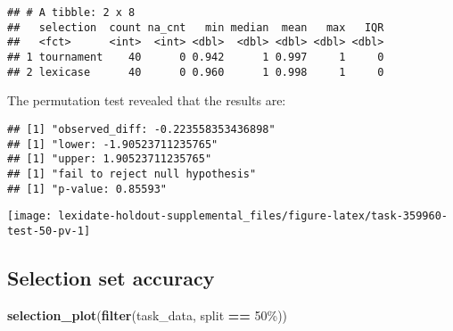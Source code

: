 \documentclass[
]{book}
\newenvironment{Shaded}{\begin{snugshade}}{\end{snugshade}}
\newcommand{\AttributeTok}[1]{\textcolor[rgb]{0.13,0.29,0.53}{#1}}
\newcommand{\DecValTok}[1]{\textcolor[rgb]{0.00,0.00,0.81}{#1}}
\newcommand{\FunctionTok}[1]{\textcolor[rgb]{0.13,0.29,0.53}{\textbf{#1}}}
\newcommand{\NormalTok}[1]{#1}
\newcommand{\OtherTok}[1]{\textcolor[rgb]{0.56,0.35,0.01}{#1}}
\newcommand{\SpecialCharTok}[1]{\textcolor[rgb]{0.81,0.36,0.00}{\textbf{#1}}}
\newcommand{\StringTok}[1]{\textcolor[rgb]{0.31,0.60,0.02}{#1}}
\begin{document}
\begin{verbatim}
## # A tibble: 2 x 8
##   selection  count na_cnt   min median  mean   max   IQR
##   <fct>      <int>  <int> <dbl>  <dbl> <dbl> <dbl> <dbl>
## 1 tournament    40      0 0.942      1 0.997     1     0
## 2 lexicase      40      0 0.960      1 0.998     1     0
\end{verbatim}

The permutation test revealed that the results are:

\begin{Shaded}
\end{Shaded}

\begin{verbatim}
## [1] "observed_diff: -0.223558353436898"
## [1] "lower: -1.90523711235765"
## [1] "upper: 1.90523711235765"
## [1] "fail to reject null hypothesis"
## [1] "p-value: 0.85593"
\end{verbatim}

\texttt{[image: lexidate-holdout-supplemental\_files/figure-latex/task-359960-test-50-pv-1]}

\hypertarget{selection-set-accuracy-47}{%
\subsection{Selection set accuracy}\label{selection-set-accuracy-47}}

\begin{Shaded}
\begin{Highlighting}[]
\FunctionTok{selection\_plot}\NormalTok{(}\FunctionTok{filter}\NormalTok{(task\_data, split }\SpecialCharTok{==} \StringTok{\textquotesingle{}50\%\textquotesingle{}}\NormalTok{))}
\end{Highlighting}
\end{Shaded}
\end{document}
